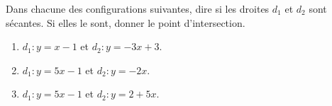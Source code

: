 
\begin{exercice}\label{exosmath-0084}

    Dans chacune des configurations suivantes, dire si les droites \( d_1\) et \( d_2\) sont sécantes. Si elles le sont, donner le point d'intersection.
    \begin{enumerate}
        \item
            \( d_1 : y=x-1\) et \( d_2:y=-3x+3\).
        \item
            \( d_1:y= 5x-1\) et \( d_2:y= -2x\).
        \item
            \( d_1:y= 5x-1\) et \( d_2:y= 2+5x\).
    \end{enumerate}

\end{exercice}
